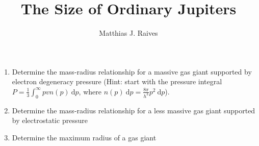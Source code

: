 \documentclass{article}
\title{The Size of Ordinary Jupiters}
\author{Matthias J. Raives}
\begin{document}
  
  \maketitle{}
  
  \begin{enumerate}
    \item Determine the mass-radius relationship for a massive gas giant supported by electron degeneracy pressure (Hint: start with the pressure integral $P=\frac{1}{3}\int_{0}^{\infty}pvn(p)\:\mathrm{d}p$, where $n(p)\:\mathrm{d}p=\frac{8\pi}{h^{3}}p^{2}\:\mathrm{d}p$).
    \item Determine the mass-radius relationship for a less massive gas giant supported by electrostatic pressure
    \item Determine the maximum radius of a gas giant
  \end{enumerate}
  
\end{document}
